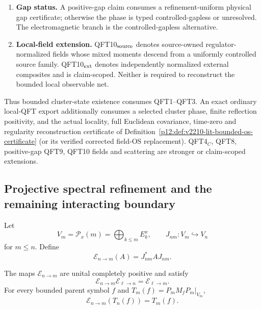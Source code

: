 \documentclass[12pt,a4paper]{article}
\begin{document}
\begin{definition}
\begin{enumerate}[label=\textnormal{(QFT\arabic*)}, leftmargin=3.4em]
\item \textbf{Gap status.} A positive-gap claim consumes a refinement-uniform physical gap certificate; otherwise the phase is typed controlled-gapless or unresolved.  The electromagnetic branch is the controlled-gapless alternative.
\item \textbf{Local-field extension.} QFT10\(_{\rm source}\) denotes source-owned regulator-normalized fields whose mixed moments descend from a uniformly controlled source family.  QFT10\(_{\rm ext}\) denotes independently normalized external composites and is claim-scoped.  Neither is required to reconstruct the bounded local observable net.
\end{enumerate}
Thus bounded cluster-state existence consumes QFT1--QFT3. An exact ordinary
local-QFT export additionally consumes a selected cluster phase, finite
reflection positivity, and the actual locality, full Euclidean covariance,
time-zero and regularity reconstruction certificate of
Definition~\ref{p12:def:v2210-lit-bounded-os-certificate} (or its verified
corrected field-OS replacement).  QFT4\(_C\), QFT8, positive-gap QFT9, QFT10 fields and scattering are stronger or claim-scoped extensions.
\end{definition}




\subsection{Projective spectral refinement and the remaining interacting boundary}
\label{p12:sec:g7-g8-update}

Let
\[
 V_m=\mathcal P_x(m)=\bigoplus_{k\le m}E_k^x,
 \qquad
 J_{nm}:V_m\hookrightarrow V_n
\]
for $m\le n$.  Define
\[
 \mathcal E_{n\to m}(A)=J_{nm}^*AJ_{nm}.
\]

\begin{theorem}
\label{p12:thm:canonical-ucp-coarse-graining}
The maps $\mathcal E_{n\to m}$ are unital completely positive and satisfy
\[
 \mathcal E_{n\to m}\mathcal E_{\ell\to n}=\mathcal E_{\ell\to m}.
\]
For every bounded parent symbol $f$ and
$T_m(f)=P_mM_fP_m|_{V_m}$,
\[
 \boxed{\mathcal E_{n\to m}(T_n(f))=T_m(f).}
\]
\end{theorem}
\end{document}
